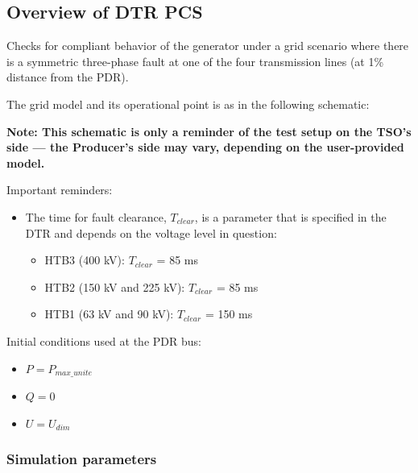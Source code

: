     \subsection{Overview of DTR PCS \DTRPcs}

    Checks for compliant behavior of the generator under a grid scenario where there is a
    symmetric three-phase fault at one of the four transmission lines (at 1\%
    distance from the PDR).

    The grid model and its operational point is as in the following schematic:
    \begin{center}
        
    \end{center}
    \begin{center}
        \small \textbf{Note: This schematic is only a reminder of the test setup on the TSO's
        side --- the Producer's side may vary, depending on the user-provided model.}
    \end{center}

    \noindent Important reminders:
    \begin{itemize}
        \item The time for fault clearance, $T_{clear}$, is a parameter that
        is specified in the DTR and depends on the voltage level in
        question:
        \begin{itemize}
            \item HTB3 (400 kV): $T_{clear}$ = 85 ms
            \item HTB2 (150 kV and 225 kV): $T_{clear}$ = 85 ms
            \item HTB1 (63 kV and 90 kV): $T_{clear}$ = 150 ms
        \end{itemize}
    \end{itemize}

    \begin{description}
        \item Initial conditions used at the PDR bus:
        \begin{itemize}
            \item $P = P_{max\_unite}$
            \item $Q = 0$
            \item $U = U_{dim}$
        \end{itemize}
    \end{description}

    \subsubsection{Simulation parameters}

